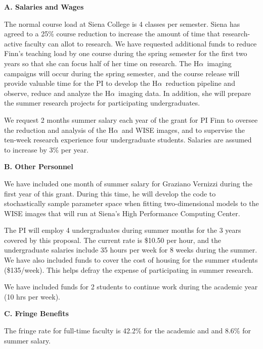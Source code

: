 \documentclass[preprint,11pt]{aastex}
\newcommand{\ha}{H$\alpha$}
\begin{document}
\begin{center}
{\bf \large A. Salaries and Wages}
\end{center}

The normal course load at Siena College is 4 classes per semester.  Siena
has agreed to a 25\% course reduction to increase the amount of time
that research-active faculty can allot to research.  We have requested additional funds to reduce
Finn's teaching load by one course during the spring semester for the
first two years so that she can
focus half of her time on research.  The \ha \ imaging campaigns will
occur during the spring semester, and the course release will provide valuable time
for the PI to develop the \ha \ reduction pipeline and observe, reduce and analyze
the \ha \ imaging data.  In addition, she will prepare the summer research
projects for participating undergraduates.  

We request 2 months summer salary each year of the grant for PI Finn
to oversee the reduction and analysis of the \ha \ and WISE images,
and to supervise the ten-week research experience four undergraduate students.  
Salaries are assumed to increase by 3\% per year.

\begin{center}
{\bf \large B. Other Personnel}
\end{center}

We have included one month of summer salary for Graziano Vernizzi
during the first year of this grant.  During this time, he will
develop the code to stochastically sample parameter space when fitting
two-dimensional models to the WISE images that will run at Siena's
High Performance Computing Center.

The PI will employ 4 undergraduates during summer months
for the 3 years covered by this proposal.  The current rate is \$10.50
per hour, and the undergraduate salaries include 35 hours per week 
for 8 weeks during the summer.  
We have also included funds to cover the cost of housing for the
summer students (\$135/week).  This helps defray the expense of
participating in summer research.

We have included funds for 2 students to continue work during the
academic year (10 hrs per week).

\begin{center}
{\bf \large C. Fringe Benefits}
\end{center}

The fringe rate for full-time faculty 
is 42.2\% for the academic and and 8.6\% for summer salary.
\end{document}
